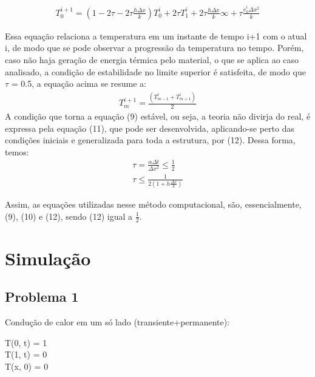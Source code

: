 \documentclass[journal]{IEEEtran}
\begin{document}
        \begin{multline}
        	T_{0}^{i+1} = (1 - 2\tau - 2\tau\frac{h\Delta x}{k})T_{0}^i + 2\tau T_1^i + 2\tau \frac{h\Delta x}{k}\infty + \tau \frac{\dot{e}_0^i\Delta x^2}{k}
        \end{multline}\cite[pp.294]{cengel}
        \par Essa equação relaciona a temperatura em um instante de tempo i+1 com o atual i, de modo que se pode observar a progressão da temperatura no tempo. Porém, caso não haja geração de energia térmica pelo material, o que se aplica ao caso analisado, a condição de estabilidade no limite superior é satisfeita, de modo que $\tau$ = 0.5, a equação acima se resume a:
        \begin{align}
        	T_m^{i+1} = \frac{(T_{m-1}^i + T_{m+1}^i)}{2}
        \end{align}
        A condição que torna a equação (9) estável, ou seja, a teoria não divirja do real, é expressa pela equação (11), que pode ser desenvolvida, aplicando-se perto das condições iniciais e generalizada para toda a estrutura, por (12). Dessa forma, temos: 
      	\begin{align}
      		\tau = \frac{\alpha \Delta t}{\Delta x^2} \leq \frac{1}{2}
      		\\
      		\tau \leq \frac{1}{2(1+h\frac{\Delta x}{k})}
      	\end{align}
      	\par Assim, as equações utilizadas nesse método computacional, são, essencialmente, (9), (10) e (12), sendo (12) igual a $\frac{1}{2}$.
	\section{Simulação}
		\subsection{Problema 1} 
		\par Condução de calor em um só lado (transiente+permanente):
	
		\begin{center}
			T(0, t) = 1\\
			T(1, t) = 0\\
			T(x, 0) = 0
		\end{center}
			
\end{document}
